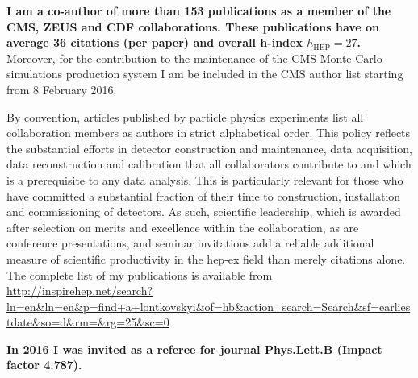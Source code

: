 \textbf{I am a co-author of more than 153 publications as a member of the CMS, ZEUS and CDF collaborations. These publications have on average 36 citations (per paper) and overall h-index  $h_\mathrm{HEP}=27$.} Moreover, for the contribution to the maintenance of the CMS Monte Carlo simulations production system I am be included in the CMS author list starting from 8 February 2016.

By convention, articles published by particle physics experiments list all collaboration members as authors in strict alphabetical order. This policy reflects the substantial efforts in detector construction and maintenance, data acquisition, data reconstruction and calibration that all collaborators contribute to and which is a prerequisite to any data analysis. This is particularly relevant for those who have committed a substantial fraction of their time to construction, installation and commissioning of detectors. As such, scientific leadership, which is awarded after selection on merits and excellence within the collaboration, as are conference presentations, and seminar invitations 
add a reliable additional measure of scientific productivity in the hep-ex field than merely citations alone.  The complete list of my publications is available from \url{http://inspirehep.net/search?ln=en&ln=en&p=find+a+lontkovskyi&of=hb&action_search=Search&sf=earliestdate&so=d&rm=&rg=25&sc=0}

\textbf{In 2016 I was invited as a referee for journal \textbf{Phys.Lett.B} (Impact factor 4.787).}

